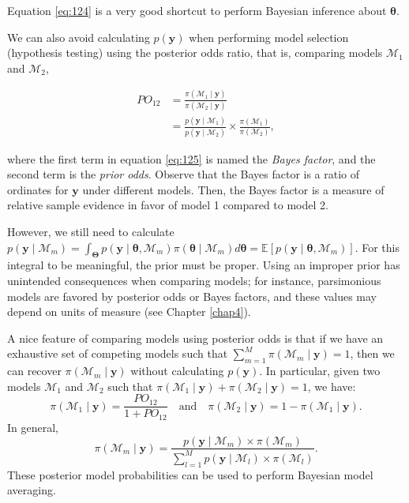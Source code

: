 Equation \ref{eq:124} is a very good shortcut to perform Bayesian inference about \( \bm{\theta} \).

We can also avoid calculating \( p(\mathbf{y}) \) when performing model selection (hypothesis testing) using the posterior odds ratio, that is, comparing models \( \mathcal{M}_1 \) and \( \mathcal{M}_2 \),

\begin{align}
	PO_{12}&=\frac{\pi(\mathcal{M}_1\mid \mathbf{y})}{\pi(\mathcal{M}_2\mid \mathbf{y})} \nonumber \\
	&=\frac{p(\mathbf{y}\mid \mathcal{M}_1)}{p(\mathbf{y}\mid \mathcal{M}_2)}\times\frac{\pi(\mathcal{M}_1)}{\pi(\mathcal{M}_2)},
	\label{eq:125}
\end{align}

where the first term in equation \ref{eq:125} is named the \textit{Bayes factor}, and the second term is the \textit{prior odds}. Observe that the Bayes factor is a ratio of ordinates for \( \mathbf{y} \) under different models. Then, the Bayes factor is a measure of relative sample evidence in favor of model 1 compared to model 2.

However, we still need to calculate \( p(\mathbf{y}\mid \mathcal{M}_m) = \int_{\mathbf{\Theta}} p(\mathbf{y}\mid \bm{\theta}, \mathcal{M}_m) \pi(\bm{\theta}\mid \mathcal{M}_m) d\bm{\theta} = \mathbb{E}\left[ p(\mathbf{y}\mid \bm{\theta}, \mathcal{M}_m) \right] \). For this integral to be meaningful, the prior must be proper. Using an improper prior has unintended consequences when comparing models; for instance, parsimonious models are favored by posterior odds or Bayes factors, and these values may depend on units of measure (see Chapter \ref{chap4}).

A nice feature of comparing models using posterior odds is that if we have an exhaustive set of competing models such that \( \sum_{m=1}^M \pi(\mathcal{M}_m \mid \mathbf{y}) = 1 \), then we can recover \( \pi(\mathcal{M}_m \mid \mathbf{y}) \) without calculating \( p(\mathbf{y}) \). In particular, given two models \( \mathcal{M}_1 \) and \( \mathcal{M}_2 \) such that \( \pi(\mathcal{M}_1 \mid \mathbf{y}) + \pi(\mathcal{M}_2 \mid \mathbf{y}) = 1 \), we have:
\[
\pi(\mathcal{M}_1 \mid \mathbf{y}) = \frac{PO_{12}}{1 + PO_{12}} \quad \text{and} \quad \pi(\mathcal{M}_2 \mid \mathbf{y}) = 1 - \pi(\mathcal{M}_1 \mid \mathbf{y}).
\]
In general,
\[
\pi(\mathcal{M}_m \mid \mathbf{y}) = \frac{p(\mathbf{y} \mid \mathcal{M}_m) \times \pi(\mathcal{M}_m)}{\sum_{l=1}^M p(\mathbf{y} \mid \mathcal{M}_l) \times \pi(\mathcal{M}_l)}.
\]
These posterior model probabilities can be used to perform Bayesian model averaging.

